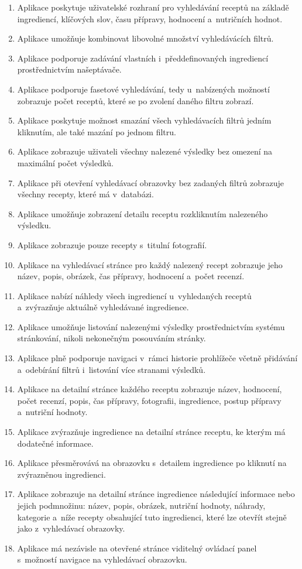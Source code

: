\begin{enumerate}
    \item Aplikace poskytuje uživatelské rozhraní pro vyhledávání receptů na základě ingrediencí, klíčových slov, času přípravy, hodnocení a~nutričních hodnot.
    \item Aplikace umožňuje kombinovat libovolné množství vyhledávácích filtrů.
    \item Aplikace podporuje zadávání vlastních i~předdefinovaných ingrediencí prostřednictvím našeptávače.
    \item Aplikace podporuje fasetové vyhledávání, tedy u~nabízených možností zobrazuje počet receptů, které se po zvolení daného filtru zobrazí.
    \item Aplikace poskytuje možnost smazání všech vyhledávacích filtrů jedním kliknutím, ale také mazání po jednom filtru.
    \item Aplikace zobrazuje uživateli všechny nalezené výsledky bez omezení na maximální počet výsledků.
    \item Aplikace při otevření vyhledávací obrazovky bez zadaných filtrů zobrazuje všechny recepty, které má v~databázi.
    \item Aplikace umožňuje zobrazení detailu receptu rozkliknutím nalezeného výsledku.
    \item Aplikace zobrazuje pouze recepty s~titulní fotografií.
    \item Aplikace na vyhledávací stránce pro každý nalezený recept zobrazuje jeho název, popis, obrázek, čas přípravy, hodnocení a~počet recenzí.
    \item Aplikace nabízí náhledy všech ingrediencí u~vyhledaných receptů a~zvýrazňuje aktuálně vyhledávané ingredience.
    \item Aplikace umožňuje listování nalezenými výsledky prostřednictvím systému stránkování, nikoli nekonečným posouváním stránky.
    \item Aplikace plně podporuje navigaci v~rámci historie prohlížeče včetně přidávání a~odebírání filtrů i~listování více stranami výsledků.
    \item Aplikace na detailní stránce každého receptu zobrazuje název, hodnocení, počet recenzí, popis, čas přípravy, fotografii, ingredience, postup přípravy a~nutriční hodnoty.
    \item Aplikace zvýrazňuje ingredience na detailní stránce receptu, ke kterým má dodatečné informace.
    \item Aplikace přesměrovává na obrazovku s~detailem ingredience po kliknutí na zvýrazněnou ingredienci.
    \item Aplikace zobrazuje na detailní stránce ingredience následující informace nebo jejich podmnožinu: název, popis, obrázek, nutriční hodnoty, náhrady, kategorie a~níže recepty obsahující tuto ingredienci, které lze otevřít stejně jako z~vyhledávací obrazovky.
    \item Aplikace má nezávisle na otevřené stránce viditelný ovládací panel s~možností navigace na vyhledávací obrazovku.

\end{enumerate}

